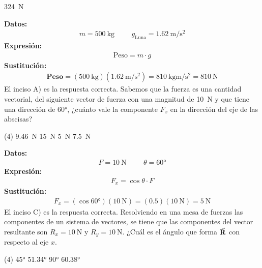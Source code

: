 \documentclass[12pt, letter]{exam}
\begin{document}
\begin{questions}
\begin{tasks}
        \task \SI{324}{\newton}
    \end{tasks}
    \textbf{Datos:}
    \begin{align*}
    m =  \SI{500}{\kilo\gram} \hspace{1cm} g_{\text{Luna}} = \SI[per-mode=fraction]{1.62}{\meter\per\square\second}
    \end{align*}
    \textbf{Expresión:}
    \begin{align*}
    \text{Peso} = m \cdot g
    \end{align*}
    \textbf{Sustitución:}
    \begin{align*}
    \textbf{Peso} = \left( \SI{500}{\kilo\gram} \right) \left( \SI[per-mode=fraction]{1.62}{\meter\per\square\second} \right) = \SI[per-mode=fraction]{810}{\kilo\gram\meter\per\square\second} = \SI{810}{\newton}
    \end{align*}
    El inciso A) es la respuesta correcta.
    \question Sabemos que la fuerza es una cantidad vectorial, del siguiente vector de fuerza con una magnitud de \SI{10}{\newton} y que tiene una dirección de \ang{60}, ¿cuánto vale la componente $F_{x}$ en la dirección del eje de las abscisas?
    \begin{tasks}(4)
        \task \SI{9.46}{\newton}
        \task \SI{15}{\newton}
        \task \SI{5}{\newton}
        \task \SI{7.5}{\newton}
    \end{tasks}
    \textbf{Datos:}
    \begin{align*}
    F = \SI{10}{\newton} \hspace{1cm} \theta = \ang{60}
    \end{align*}
    \textbf{Expresión:}
    \begin{align*}
    F_{x} = \cos \theta \cdot F
    \end{align*}
    \textbf{Sustitución:}
    \begin{align*}
    F_{x} = \left( \cos \ang{60} \right) \left( \SI{10}{\newton} \right) = \left( 0.5 \right) \left( \SI{10}{\newton} \right) = \SI{5}{\newton}
    \end{align*}
    El inciso C) es la respuesta correcta.
    \question Resolviendo en una mesa de fuerzas las componentes de un sistema de vectores, se tiene que las componentes del vector resultante son $R_{x} = \SI{10}{\newton}$ y $R_{y} = \SI{10}{\newton}$. ¿Cuál es el ángulo que forma $\va{R}$ con respecto al eje $x$.
    \begin{tasks}(4)
        \task \ang{45}
        \task \ang{51.34}
        \task \ang{90}
        \task \ang{60.38}
    \end{tasks}

\end{questions}
\end{document}
